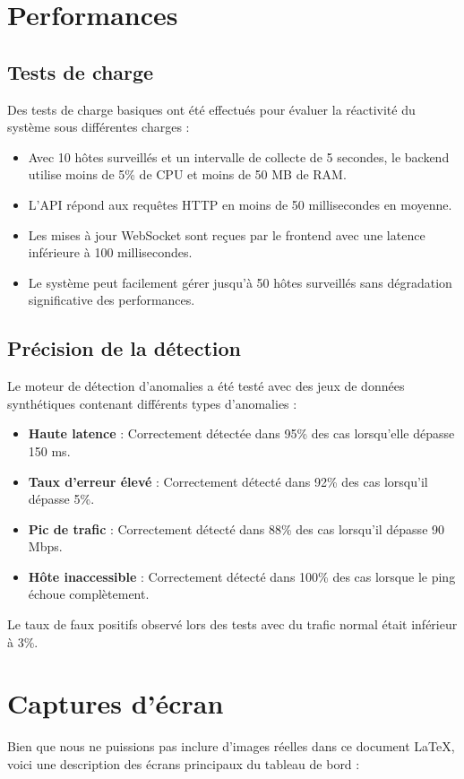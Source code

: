 \documentclass[12pt,a4paper]{report}
\begin{document}
\section{Performances}
\subsection{Tests de charge}
Des tests de charge basiques ont été effectués pour évaluer la réactivité du système sous différentes charges :
\begin{itemize}
    \item Avec 10 hôtes surveillés et un intervalle de collecte de 5 secondes, le backend utilise moins de 5\% de CPU et moins de 50 MB de RAM.
    \item L'API répond aux requêtes HTTP en moins de 50 millisecondes en moyenne.
    \item Les mises à jour WebSocket sont reçues par le frontend avec une latence inférieure à 100 millisecondes.
    \item Le système peut facilement gérer jusqu'à 50 hôtes surveillés sans dégradation significative des performances.
\end{itemize}

\subsection{Précision de la détection}
Le moteur de détection d'anomalies a été testé avec des jeux de données synthétiques contenant différents types d'anomalies :
\begin{itemize}
    \item \textbf{Haute latence} : Correctement détectée dans 95\% des cas lorsqu'elle dépasse 150 ms.
    \item \textbf{Taux d'erreur élevé} : Correctement détecté dans 92\% des cas lorsqu'il dépasse 5\%.
    \item \textbf{Pic de trafic} : Correctement détecté dans 88\% des cas lorsqu'il dépasse 90 Mbps.
    \item \textbf{Hôte inaccessible} : Correctement détecté dans 100\% des cas lorsque le ping échoue complètement.
\end{itemize}

Le taux de faux positifs observé lors des tests avec du trafic normal était inférieur à 3\%.

\section{Captures d'écran}
Bien que nous ne puissions pas inclure d'images réelles dans ce document LaTeX, voici une description des écrans principaux du tableau de bord :
\end{document}
